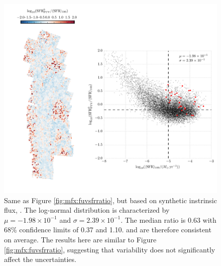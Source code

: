 \documentclass[iop, tighten]{emulateapj}
\begin{document}
\begin{figure}
\centering
\includegraphics[width=\textwidth]{m31flux-figures/sfr_fuv0-vs-mean.pdf}
\caption[Ratio of the \sfr{} based on the synthetic intrinsic \fuv{} flux to
the $100\myr$ mean \sfr{}.]{Same as Figure \ref{fig:mfx:fuvsfrratio}, but based
    on synthetic instrinsic flux, \sfrfuvz{}. The log-normal distribution is
    characterized by $\mu = -1.98\times 10^{-1}$ and $\sigma = 2.39\times
    10^{-1}$. The median ratio is 0.63 with 68\% confidence limits of 0.37 and
    1.10. \sfrfuvz{} and \sfroneh{} are therefore consistent on average. The
    results here are similar to Figure \ref{fig:mfx:fuvsfrratio}, suggesting
    that \sfh{} variability does not significantly affect the \sfrfuv{}
    uncertainties.
}
\label{fig:mfx:fuvzsfrratio}
\end{figure}
\end{document}

